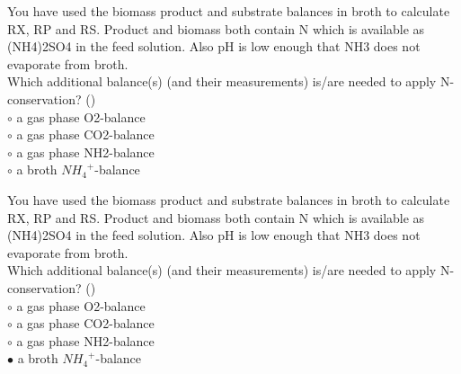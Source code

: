 \documentclass[]{beamer}
\begin{document}
\begin{frame}[shrink] {}
\addtocounter{questions}{1}
\color{blue}
You have used the biomass product and substrate balances in broth to calculate RX, RP and RS. Product and biomass both contain N which is available as (NH4)2SO4 in the feed solution. Also pH is low enough that NH3 does not evaporate from broth.\\[0.3em]
Which additional balance(s) (and their measurements) is/are needed to apply N-conservation? ()\\
\color{black}
\setlength{\parindent}{-0.4cm}
{\color{red}$\circ$}   a gas phase O2-balance \\
{\color{red}$\circ$} a gas phase CO2-balance \\
{\color{red}$\circ$} a gas phase NH2-balance \\
{\color{red}$\circ$} a broth ${NH_4}^+$-balance  \\
\end{frame}
\begin{frame}[shrink] {}
\addtocounter{answers}{1}
\color{blue}
You have used the biomass product and substrate balances in broth to calculate RX, RP and RS. Product and biomass both contain N which is available as (NH4)2SO4 in the feed solution. Also pH is low enough that NH3 does not evaporate from broth.\\[0.3em]
Which additional balance(s) (and their measurements) is/are needed to apply N-conservation? ()\\
\color{black}
\setlength{\parindent}{-0.4cm}
{\color{red}$\circ$}   a gas phase O2-balance \\
{\color{red}$\circ$} a gas phase CO2-balance \\
{\color{red}$\circ$} a gas phase NH2-balance \\
{\color{red}$\bullet$} a broth ${NH_4}^+$-balance  \\
\end{frame}
\end{document}
